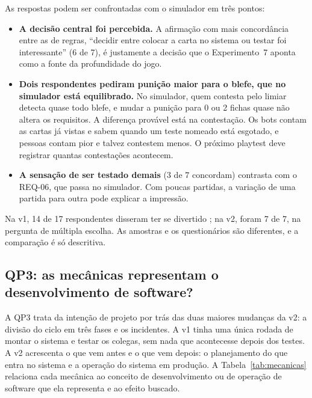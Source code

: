 As respostas podem ser confrontadas com o simulador em três pontos:
\begin{itemize}
  \item \textbf{A decisão central foi percebida.} A afirmação com mais concordância entre as de regras, ``decidir
    entre colocar a carta no sistema ou testar foi interessante'' (6 de 7), é justamente a decisão que o
    Experimento~7 aponta como a fonte da profundidade do jogo.
  \item \textbf{Dois respondentes pediram punição maior para o blefe, que no simulador está
    equilibrado.} No simulador, quem contesta pelo limiar detecta quase todo blefe, e mudar a punição para 0 ou 2 fichas quase não
    altera os requisitos. A diferença provável está na contestação. Os bots contam as cartas já vistas e sabem
    quando um teste nomeado está esgotado, e pessoas contam pior e talvez contestem menos. O próximo playtest deve
    registrar quantas contestações acontecem.
  \item \textbf{A sensação de ser testado demais} (3 de 7 concordam) contrasta com o REQ-06, que passa no
    simulador. Com poucas partidas, a variação de uma partida para outra pode explicar a impressão.
\end{itemize}

Na v1, 14 de 17 respondentes disseram ter se divertido \cite{oliveira2025critical}; na v2, foram 7 de 7,
na pergunta de múltipla escolha. As amostras e os questionários são diferentes, e a comparação é só descritiva.

\subsection{QP3: as mecânicas representam o desenvolvimento de software?}
\label{sec:qp3}

A QP3 trata da intenção de projeto por trás das duas maiores mudanças da v2: a divisão do ciclo em três fases e
os incidentes. A v1 tinha uma única rodada de montar o sistema e testar os colegas, sem nada que acontecesse
depois dos testes. A v2 acrescenta o que vem antes e o que vem depois: o planejamento do que entra no sistema e a
operação do sistema em produção. A Tabela~\ref{tab:mecanicas} relaciona cada mecânica ao conceito de
desenvolvimento ou de operação de software que ela representa e ao efeito buscado.

